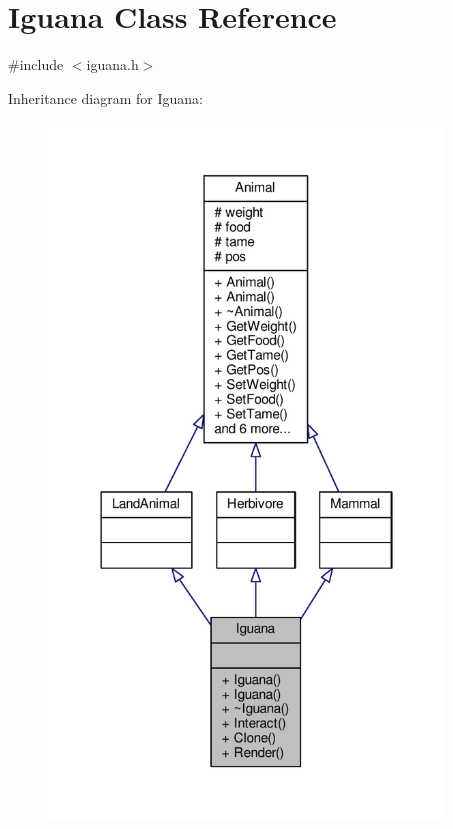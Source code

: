 \hypertarget{classIguana}{}\section{Iguana Class Reference}
\label{classIguana}


{\ttfamily \#include $<$iguana.\+h$>$}



Inheritance diagram for Iguana\+:
\nopagebreak
\begin{figure}[H]
\begin{center}
\leavevmode
\includegraphics[width=298pt]{classIguana__inherit__graph}
\end{center}
\end{figure}


